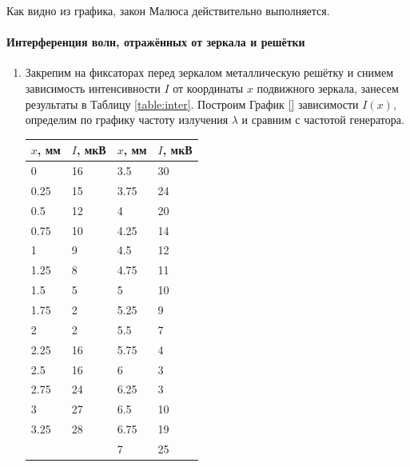 \documentclass[a4paper, 12pt]{article}
\begin{document}
    Как видно из графика, закон Малюса действительно выполняется.
    
\paragraph*{Интерференция волн, отражённых от зеркала и решётки}

\begin{enumerate}
    \item Закрепим на фиксаторах перед зеркалом металлическую решётку и снимем зависимость интенсивности $I$ от координаты $x$ подвижного зеркала, занесем результаты в Таблицу \ref{table:inter}. Построим График \ref{} зависимости $I(x)$, определим по графику частоту излучения $\lambda$ и сравним с частотой генератора.
    
    \begin{minipage}{0.45\textwidth}
    \begin{center}
        \begin{tabular}{|l|l|l|l|}
        \hline
        $x$, мм & $I$, мкВ & $x$, мм & $I$, мкВ \\ \hline
        0       & 16       & 3.5     & 30       \\ \hline
        0.25    & 15       & 3.75    & 24       \\ \hline
        0.5     & 12       & 4       & 20       \\ \hline
        0.75    & 10       & 4.25    & 14       \\ \hline
        1       & 9        & 4.5     & 12       \\ \hline
        1.25    & 8        & 4.75    & 11       \\ \hline
        1.5     & 5        & 5       & 10       \\ \hline
        1.75    & 2        & 5.25    & 9        \\ \hline
        2       & 2        & 5.5     & 7        \\ \hline
        2.25    & 16       & 5.75    & 4        \\ \hline
        2.5     & 16       & 6       & 3        \\ \hline
        2.75    & 24       & 6.25    & 3        \\ \hline
        3       & 27       & 6.5     & 10       \\ \hline
        3.25    & 28       & 6.75    & 19       \\ \hline
                &          & 7       & 25       \\ \hline

\end{tabular}
\end{center}
\end{minipage}
\end{enumerate}
\end{document}
